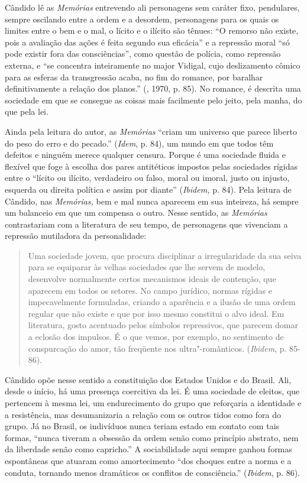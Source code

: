 Cândido lê as \emph{Memórias} entrevendo ali personagens sem caráter
fixo, pendulares, sempre oscilando entre a ordem e a desordem,
personagens para os quais os limites entre o bem e o mal, o lícito e o
ilícito são tênues: ``O remorso não existe, pois a avaliação das ações é
feita segundo sua eficácia'' e a repressão moral ``só pode existir fora
das consciências'', como questão de polícia, como repressão externa, e
``se concentra inteiramente no major Vidigal, cujo deslizamento cômico
para as esferas da transgressão acaba, no fim do romance, por baralhar
definitivamente a relação dos planos.'' (, 1970, p. 85). No
romance, é descrita uma sociedade em que se consegue as coisas mais
facilmente pelo jeito, pela manha, do que pela lei.

Ainda pela leitura do autor, as \emph{Memórias} ``criam um universo que
parece liberto do peso do erro e do pecado.'' (\emph{Idem}, p. 84), um
mundo em que todos têm defeitos e ninguém merece qualquer censura.
Porque é uma sociedade fluida e flexível que foge à escolha dos pares
antitéticos impostos pelas sociedades rígidas entre o ``lícito ou
ilícito, verdadeiro ou falso, moral ou imoral, justo ou injusto,
esquerda ou direita política e assim por diante'' (\emph{Ibidem,} p.
84). Pela leitura de Cândido, nas \emph{Memórias,} bem e mal nunca
aparecem em sua inteireza, há sempre um balanceio em que um compensa o
outro. Nesse sentido, as \emph{Memórias} contrastariam com a literatura
de seu tempo, de personagens que vivenciam a repressão mutiladora da
personalidade:

\begin{quote}
Uma sociedade jovem, que procura disciplinar a irregularidade da sua
seiva para se equiparar às velhas sociedades que lhe servem de modelo,
desenvolve normalmente certos mecanismos ideais de contenção, que
aparecem em todos os setores. No campo jurídico, normas rígidas e
impecavelmente formuladas, criando a aparência e a ilusão de uma ordem
regular que não existe e que por isso mesmo constitui o alvo ideal. Em
literatura, gosto acentuado pelos símbolos repressivos, que parecem
domar a eclosão dos impulsos. É o que vemos, por exemplo, no sentimento
de conspurcação do amor, tão freqüente nos ultra"-românticos.
(\emph{Ibidem}, p. 85-86).
\end{quote}

Cândido opõe nesse sentido a constituição dos Estados Unidos e do
Brasil. Ali, desde o início, há uma presença coercitiva da lei. É uma
sociedade de eleitos, que pertencem à mesma lei, um endurecimento do
grupo que reforçaria a identidade e a resistência, mas desumanizaria a
relação com os outros tidos como fora do grupo. Já no Brasil, os
indivíduos nunca teriam estado em contato com tais formas, ``nunca
tiveram a obsessão da ordem senão como princípio abstrato, nem da
liberdade senão como capricho.'' A sociabilidade aqui sempre ganhou
formas espontâneas que atuaram como amortecimento ``dos choques entre a
norma e a conduta, tornando menos dramáticos os conflitos de
consciência.'' (\emph{Ibidem}, p. 86).

